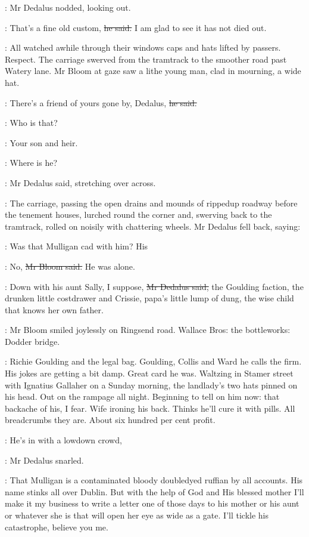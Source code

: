 :
Mr Dedalus nodded, looking out.

\Bloom:
That's a fine old custom,
\sout{he said.}
I am glad to see it has not died out.

:
All watched awhile through their windows
caps and hats lifted by passers.
Respect.
The carriage swerved from the tramtrack to the smoother road past Watery lane.
Mr Bloom at gaze saw a lithe young man,
clad in mourning, a wide hat.

\Bloom:
There's a friend of yours gone by, Dedalus,
\sout{he said.}

\simon:
Who is that?

\Bloom:
Your son and heir.

\simon:
Where is he?

:
Mr Dedalus said,
stretching over across.

:
The carriage, passing the open drains and mounds of rippedup roadway
before the tenement houses,
lurched round the corner
and, swerving back to the tramtrack, rolled on noisily with chattering wheels.
Mr Dedalus fell back, saying:

\simon:
Was that Mulligan cad with him?
His 

\Bloom:
No,
\sout{Mr Bloom said.}
He was alone.

\simon:
Down with his aunt Sally, I suppose,
\sout{Mr Dedalus said,}
the Goulding faction,
the drunken little costdrawer
and Crissie, papa's little lump of dung,
the wise child that knows her own father.

:
Mr Bloom smiled joylessly on Ringsend road.
Wallace Bros:
the bottleworks:
Dodder bridge.

\BloomInt:
Richie Goulding and the legal bag.
Goulding, Collis and Ward he calls the firm.
His jokes are getting a bit damp.
Great card he was.
Waltzing in Stamer street with Ignatius Gallaher on a Sunday morning,
the landlady's two hats pinned on his head.
Out on the rampage all night.
Beginning to tell on him now:
that backache of his, I fear.
Wife ironing his back.
Thinks he'll cure it with pills.
All breadcrumbs they are.
About six hundred per cent profit.

\simon:
He's in with a lowdown crowd,

:
Mr Dedalus snarled.

\simon:
That Mulligan is a contaminated bloody doubledyed ruffian by all accounts.
His name stinks all over Dublin.
But with the help of God and His blessed mother
I'll make it my business to write a letter
one of those days
to his mother or his aunt or whatever she is
that will open her eye as wide as a gate.
I'll tickle his catastrophe, believe you me.

